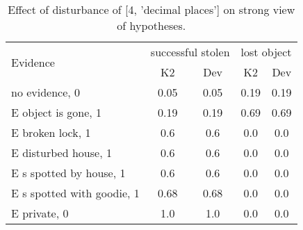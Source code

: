 \begin{table}\begin{tabular}{l|cc|cc}\toprule\multirow{2}{*}{Evidence} & \multicolumn{2}{c}{successful stolen}& \multicolumn{2}{c}{lost object}\\& {K2} & {Dev}& {K2} & {Dev}\\\midrule
no evidence, 0 & 0.05&0.05&0.19&0.19\\E object is gone, 1 & 0.19&0.19&0.69&0.69\\E broken lock, 1 & 0.6&0.6&0.0&0.0\\E disturbed house, 1 & 0.6&0.6&0.0&0.0\\E s spotted by house, 1 & 0.6&0.6&0.0&0.0\\E s spotted with goodie, 1 & 0.68&0.68&0.0&0.0\\E private, 0 & 1.0&1.0&0.0&0.0\\\bottomrule\end{tabular}\caption{Effect of disturbance of [4, 'decimal places'] on strong view of hypotheses.}\end{table}